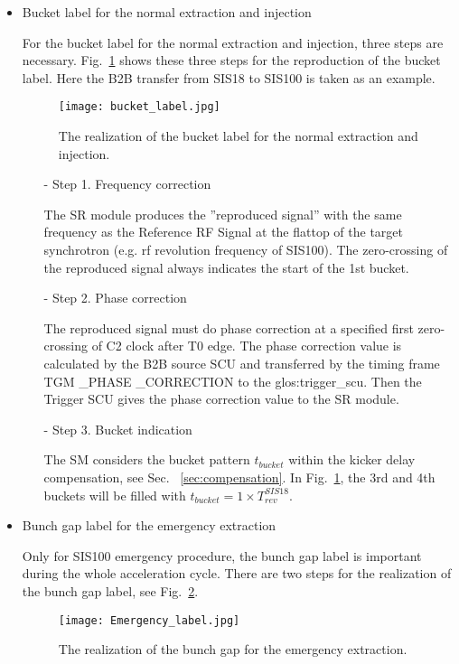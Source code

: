 \begin{itemize}
\item Bucket label for the normal extraction and injection

For the bucket label for the normal extraction and injection, three steps are necessary. Fig.~\ref{bucket_label} shows these three steps for the reproduction of the bucket label. Here the B2B transfer from SIS18 to SIS100 is taken as an example.
\begin{figure}[H]
   \centering   
   \texttt{[image: bucket\_label.jpg]}
   \caption{The realization of the bucket label for the normal extraction and injection.}
   \label{bucket_label}
\end{figure}  
\begin{itemize}
\item[-] Step 1. Frequency correction

The \gls{SR} module produces the ''reproduced signal'' with  the same frequency as the Reference RF Signal at the flattop of the target synchrotron (e.g. rf revolution frequency of SIS100). The zero-crossing of the reproduced signal always indicates the start of the 1st bucket.
\item[-] Step 2. Phase correction

The reproduced signal must do phase correction at a specified first zero-crossing of C2 clock after T0 edge. The phase correction value is calculated by the B2B source SCU and transferred by the timing frame TGM \_PHASE \_CORRECTION to the \gls{glos:trigger_scu}. Then the Trigger SCU gives the phase correction value to the SR module.

\item[-] Step 3. Bucket indication

The SM considers the bucket pattern $t_{\mathit{bucket}}$ within the kicker delay compensation, see Sec. ~\ref{sec:compensation}. In Fig.~\ref{bucket_label}, the 3rd and 4th buckets will be filled with $t_{\mathit{bucket}}=1\times T_{\mathit{rev}}^{\mathit{SIS18}}$. 
\end{itemize}

\item Bunch gap label for the emergency extraction

Only for SIS100 emergency procedure, the bunch gap label is important during the whole acceleration cycle. There are two steps for the realization of the bunch gap label, see Fig.~\ref{Emergency_label}.
\begin{figure}[!htb]
   \centering   
   \texttt{[image: Emergency\_label.jpg]}
   \caption{The realization of the bunch gap for the emergency extraction.}
   \label{Emergency_label}
\end{figure} 


\end{itemize}
